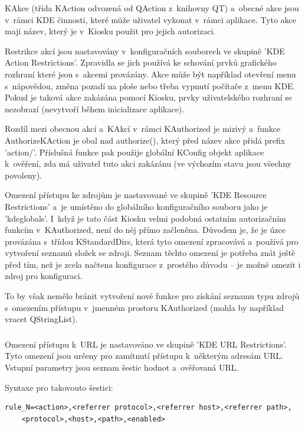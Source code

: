 KAkce (třída KAction odvozená od QAction z~knihovny QT) a~obecné akce jsou
v~rámci KDE  činnosti, které může uživatel vykonat v~rámci aplikace. Tyto akce
mají název, který je v~Kiosku použit pro jejich autorizaci.

Restrikce akcí jsou nastavovány v~konfiguračních souborech ve skupině
'KDE Action Restrictions'. Zpravidla se jich používá ke schování prvků
grafického rozhraní které jsou s~akcemi provázány. Akce může být
například otevření menu s~nápovědou, změna pozadí na ploše nebo třeba vypnutí
počítače z~menu KDE. Pokud je taková akce zakázána pomocí Kiosku, prvky
uživatelského rozhraní se nezobrazí (nevytvoří během inicializace aplikace).

Rozdíl mezi obecnou akcí a~KAkcí v~rámci KAuthorized je mizivý a~funkce
AuthorizeKAction je obal nad authorize(), který před název akce přidá prefix
'action/'. Příslušná funkce pak použije globální KConfig objekt aplikace
k~ověření, zda má uživatel tuto akci zakázánu (ve výchozím stavu jsou všechny
povoleny).

Omezení přístupu ke zdrojům je nastavované ve skupině
'KDE Resource Restrictions' a~je umístěno do globálního konfiguračního souboru
jako je 'kdeglobals'. I~když je tato část Kiosku velmi podobná ostatním
autorizačním funkcím v~KAuthorized, není do něj přímo začleněna. Důvodem je, že
je úzce provázána s~třídou KStandardDirs, která tyto omezení zpracovává
a~používá pro vytvoření seznamů složek se zdroji. Seznam těchto omezení je
potřeba znát ještě před tím, než je zcela načtena konfigurace z~prostého důvodu
-- je možné omezit i zdroj pro konfiguraci.

To by však nemělo bránit vytvoření nové funkce pro získání seznamu typu zdrojů
s~omezením přístupu v~jmenném prostoru KAuthorized (mohla by například vracet
QStringList).

\subsubsection{}
Omezení přístupu k~URL je nastavováno ve skupině 'KDE URL Restrictions'. Tyto
omezení jsou určeny pro zamítnutí přístupu k~některým adresám URL. Vstupní
parametry jsou seznam šestic hodnot a~ověřovaná URL.

Syntaxe pro takovouto šestici:
\begin{verbatim}
rule_N=<action>,<referrer protocol>,<referrer host>,<referrer path>,
    <protocol>,<host>,<path>,<enabled>
\end{verbatim}

